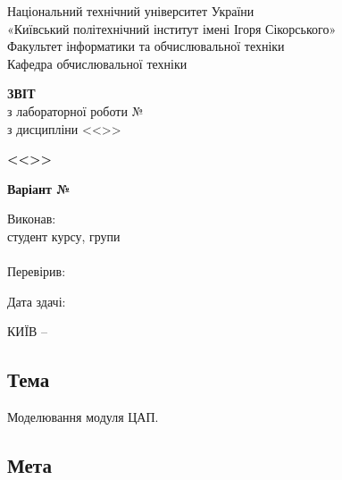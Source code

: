 \documentclass[14pt, a4paper]{extreport}
\begin{document}
	
	\begin{titlepage}
		\begin{center}
			\normalsize
			Національний технічний університет України\\
			«Київський політехнічний інститут імені Ігоря Сікорського» \\[0.5em]
			Факультет інформатики та обчислювальної техніки\\
			Кафедра обчислювальної техніки
			
			\vfill
			
			{\large \textbf{ЗВІТ}\\[0.5em]}
			{з лабораторної роботи №\LabNumber \\}
			{з дисципліни <<\CourseTitle>>}
			
			\vspace{2em}
			
			{\textbf{<<\Topic>>}}
			
			\vspace{1em}
			
			{\textbf{Варіант №\Variant}}
			
			\vfill
			
			\begin{flushright}
				Виконав: \\ студент \CourseNumber{} курсу, групи \StudentGroup \\
				\StudentName \\[1em]
				Перевірив: \\ \Teacher
			\end{flushright}
			
			\vfill
			
			\begin{flushright}
				Дата здачі: \DTMtoday
			\end{flushright}
			
			\vspace{5em}
			КИЇВ -- \ReportYear
		\end{center}
	\end{titlepage}
	
	\clearpage
	\setcounter{page}{2}
	
	\subsection*{Тема} 
	
	Моделювання модуля ЦАП.
	
	\subsection*{Мета} 
	
\end{document}
